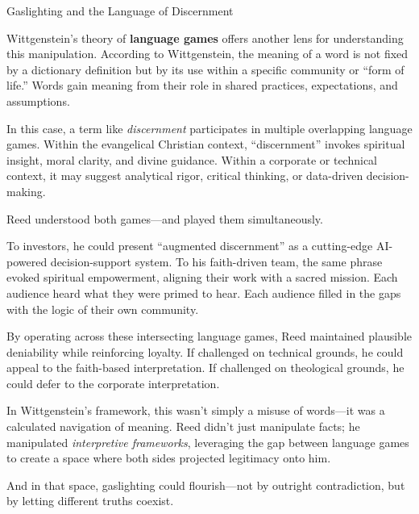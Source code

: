 \begin{HistoricalSidebar}{Gaslighting and the Language of Discernment}
    \medskip
    
    Wittgenstein’s theory of \textbf{language games} offers another lens for understanding this manipulation. According to Wittgenstein, the meaning of a word is not fixed by a dictionary definition but by its use within a specific community or “form of life.” Words gain meaning from their role in shared practices, expectations, and assumptions.
    
    \medskip
    
    In this case, a term like \textit{discernment} participates in multiple overlapping language games. Within the evangelical Christian context, “discernment” invokes spiritual insight, moral clarity, and divine guidance. Within a corporate or technical context, it may suggest analytical rigor, critical thinking, or data-driven decision-making.
    
    \medskip
    
    Reed understood both games—and played them simultaneously.
    
    \medskip
    
    To investors, he could present “augmented discernment” as a cutting-edge AI-powered decision-support system. To his faith-driven team, the same phrase evoked spiritual empowerment, aligning their work with a sacred mission. Each audience heard what they were primed to hear. Each audience filled in the gaps with the logic of their own community.
    
    \medskip
    
    By operating across these intersecting language games, Reed maintained plausible deniability while reinforcing loyalty. If challenged on technical grounds, he could appeal to the faith-based interpretation. If challenged on theological grounds, he could defer to the corporate interpretation.
    
    \medskip
    
    In Wittgenstein’s framework, this wasn’t simply a misuse of words—it was a calculated navigation of meaning. Reed didn’t just manipulate facts; he manipulated \textit{interpretive frameworks}, leveraging the gap between language games to create a space where both sides projected legitimacy onto him.
    
    \medskip
    
    And in that space, gaslighting could flourish—not by outright contradiction, but by letting different truths coexist.
    
\end{HistoricalSidebar}
    


